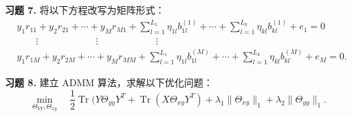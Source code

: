 \noindent\textbf{习题 7.} 将以下方程改写为矩阵形式：
\[
\begin{aligned}
&y_1r_{11}+y_2r_{21}+\cdots+y_Mr_{M1}+\sum_{l=1}^{L_1}\eta_{1l}b_{1l}^{(1)}+\cdots+\sum_{l=1}^{L_k}\eta_{kl}b_{kl}^{(1)}+e_1=0\\
&\qquad\vdots\qquad\qquad\qquad\vdots\qquad\qquad\qquad\vdots\\
&y_1r_{1M}+y_2r_{2M}+\cdots+y_Mr_{MM}+\sum_{l=1}^{L_1}\eta_{1l}b_{1l}^{(M)}+\cdots+\sum_{l=1}^{L_k}\eta_{kl}b_{kl}^{(M)}+e_M=0.
\end{aligned}
\]

\noindent\textbf{习题 8.} 建立 ADMM 算法，求解以下优化问题：
\[
\min_{\Theta_{YY},\Theta_{xy}}\quad\frac12\operatorname{Tr}\bigl(Y\Theta_{yy}Y^T+\operatorname{Tr}(X\Theta_{xy}Y^T)+\lambda_1\lVert\Theta_{xy}\rVert_1+\lambda_2\lVert\Theta_{yy}\rVert_1.
\]
